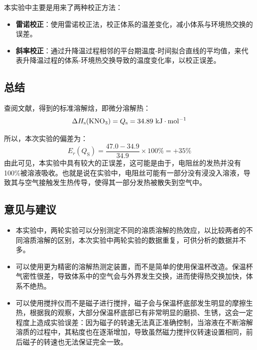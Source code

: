 \documentclass[cn,hazy,pku,12pt,normal,math=newtx,cite=super]{elegantnote}
\begin{document}
本实验中主要是用来了两种校正方法：
\begin{itemize}
    \item \textbf{雷诺校正}：使用雷诺校正法，校正体系的温差变化，减小体系与环境热交换的误差。
    \item \textbf{斜率校正}：通过升降温过程相邻的平台期温度-时间拟合直线的平均值，来代表升降温过程的体系-环境热交换导致的温度变化率，以校正误差。
\end{itemize}
\subsection{总结}

查阅文献\cite{haynes2016crc}，得到的标准溶解焓，即微分溶解热：
\begin{equation*}
    \Delta H_{\mathrm{s}}(\ce{KNO_3}) = Q_{\mathrm{s}} = 34.89 \mathrm{~kJ\cdot mol^{-1}}
\end{equation*}

所以，本次实验的偏差为：
\begin{equation*}
    E_r(Q_\mathrm{S}) = \frac{47.0-34.9}{34.9}\times 100\% = + 35\%
\end{equation*}
由此可见，本实验中具有较大的正误差，这可能是由于，电阻丝的发热并没有100\%被溶液吸收。也就是说在实验中，电阻丝可能有一部分没有浸没入溶液，导致其与空气接触发生热传导，使得其一部分发热被散失到空气中。
\subsection{意见与建议}
\begin{itemize}
    \item 本实验中，两轮实验可以分别测定不同的溶质溶解的热效应，以比较两者的不同溶质溶解的区别，本次实验中两轮实验的数据重复，可供分析的数据并不多。
    \item 可以使用更为精密的溶解热测定装置，而不是简单的使用保温杯改造。保温杯气密性很差，导致体系中的空气会与外界发生交换，进而使得热交换加快，体系不绝热。
    \item 可以使用搅拌仪而不是磁子进行搅拌，磁子会与保温杯底部发生明显的摩擦生热，根据我的观察，大部分保温杯底部已有非常明显的磨损、生锈，这会一定程度上造成实验误差：因为磁子的转速无法真正准确控制，当溶液在不断溶解溶质的过程中，其粘度也在逐渐增加，导致虽然磁力搅拌仪转速设置相同，前后磁子的转速也无法保证完全一致。
\end{itemize}





\end{document}
